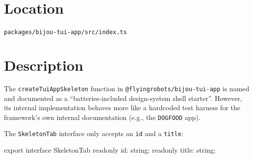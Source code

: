 \section{Location}\label{record-130-location}

\texttt{p\allowbreak{}a\allowbreak{}c\allowbreak{}k\allowbreak{}a\allowbreak{}g\allowbreak{}e\allowbreak{}s\allowbreak{}/\allowbreak{}b\allowbreak{}i\allowbreak{}j\allowbreak{}o\allowbreak{}u\allowbreak{}-\allowbreak{}t\allowbreak{}u\allowbreak{}i\allowbreak{}-\allowbreak{}a\allowbreak{}p\allowbreak{}p\allowbreak{}/\allowbreak{}s\allowbreak{}r\allowbreak{}c\allowbreak{}/\allowbreak{}i\allowbreak{}n\allowbreak{}d\allowbreak{}e\allowbreak{}x\allowbreak{}.\allowbreak{}t\allowbreak{}s}

\section{Description}\label{record-130-description}

The \texttt{c\allowbreak{}r\allowbreak{}e\allowbreak{}a\allowbreak{}t\allowbreak{}e\allowbreak{}T\allowbreak{}u\allowbreak{}i\allowbreak{}A\allowbreak{}p\allowbreak{}p\allowbreak{}S\allowbreak{}k\allowbreak{}e\allowbreak{}l\allowbreak{}e\allowbreak{}t\allowbreak{}o\allowbreak{}n} function in \texttt{@\allowbreak{}f\allowbreak{}l\allowbreak{}y\allowbreak{}i\allowbreak{}n\allowbreak{}g\allowbreak{}r\allowbreak{}o\allowbreak{}b\allowbreak{}o\allowbreak{}t\allowbreak{}s\allowbreak{}/\allowbreak{}b\allowbreak{}i\allowbreak{}j\allowbreak{}o\allowbreak{}u\allowbreak{}-\allowbreak{}t\allowbreak{}u\allowbreak{}i\allowbreak{}-\allowbreak{}a\allowbreak{}p\allowbreak{}p} is named and documented as a ``batteries-included design-system shell starter''. However, its internal implementation behaves more like a hardcoded test harness for the framework's own internal documentation (e.g., the \texttt{D\allowbreak{}O\allowbreak{}G\allowbreak{}F\allowbreak{}O\allowbreak{}O\allowbreak{}D} app).

The \texttt{S\allowbreak{}k\allowbreak{}e\allowbreak{}l\allowbreak{}e\allowbreak{}t\allowbreak{}o\allowbreak{}n\allowbreak{}T\allowbreak{}a\allowbreak{}b} interface only accepts an \texttt{i\allowbreak{}d} and a \texttt{t\allowbreak{}i\allowbreak{}t\allowbreak{}l\allowbreak{}e}:

\begin{CodeBlock}
export interface SkeletonTab {
  readonly id: string;
  readonly title: string;
}
\end{CodeBlock}


